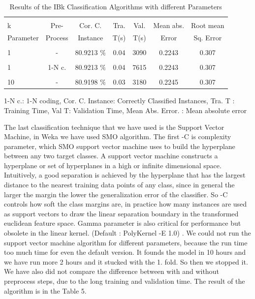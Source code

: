 \documentclass[a4paper]{article}
\begin{document}
\begin{table}
\begin{tabular}{|l| c | c | c | c |c |c |}

\hline & & & & & & \\
k &  Pre- & Cor. C. & Tra. & Val. & Mean abs.  & Root mean \\
Parameter& Process & Instance & T(s) &  T(s) & Error & Sq. Error \\
\hline & & & & & & \\
1 	 & - &			80.9213		   $\%$ &	0.04		& 	3090	 & 	0.2243	 & 0.307  \\ 
\hline & & & & & & \\	
1 	 & 1-N c.  &		 80.9213		   $\%$ &	0.04		& 	7615	 & 	 0.2243	 &  0.307  \\ 
\hline & & & & & & \\	
10	 & - &		  	80.9198		 $\%$ &	0.03		& 	3180  	&	0.2245	 & 	0.307 	  \\ 
\hline
\end{tabular}
\caption{Results of the IBk Classification Algorithms with different Parameters}
	 1-N c.: 1-N coding,
	Cor. C. Instance:  Correctly Classified Instances,
	Tra. T : Training Time,
	Val T: Validation Time,
	Mean Abs. Error. : Mean absolute error 
\end{table}

The last classification technique that we have used is the Support Vector
Machine, in Weka we have used SMO algorithm. The first -C is complexity
parameter, which SMO support vector machine uses to build the hyperplane
between any two target classes. A support vector machine constructs a
hyperplane or set of hyperplanes in a high or infinite dimensional space.
Intuitively, a good separation is achieved by the hyperplane that has the
largest distance to the nearest training data points of any class, since in
general the larger the margin the lower the generalization error of the
classifier. So -C controls how soft the class margins are, in practice how many
instances are used as support vectors to draw the linear separation boundary in
the transformed euclidean feature space. Gamma parameter is also critical for
performance but obsolete in the linear kernel. (Default : PolyKernel -E 1.0) .
We could not run the support vector machine algorithm for different parameters,
because the run time too much time for even the default version. It founds the
model in 10 hours and we have run more 2 hours and it stucked with the 1. fold.
So then we stopped it. We have also did not  compare the difference between
with and without preprocess steps, due to the long training and validation
time. The result of the algorithm is in the Table 5.
\end{document}
